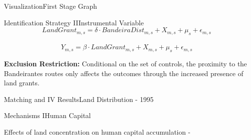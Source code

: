 \documentclass[aspectratio=1610]{beamer}
\begin{document}
\begin{frame}{Visualization}{First Stage Graph}
    \begin{figure}[h!]
        \begin{center}
        \end{center}
      \end{figure}
\end{frame}

\begin{frame}{Identification Strategy II}{Instrumental Variable}
    \begin{equation}
        \label{eqn:firststage}
        LandGrant_{m,s} = \delta \cdot BandeiraDist_{m,s} +  X_{m,s} + \mu_s  + \epsilon_{m,s}
      \end{equation}

      \begin{equation}
        \label{eqn:ivequation}
        Y_{m,s} = \beta \cdot \widehat{LandGrant}_{m,s} + X_{m,s} + \mu_s +  \epsilon_{m,s}
      \end{equation}

    \vspace{2mm}
      
    \begin{outline}
        \1 \textbf{Exclusion Restriction:} Conditional on the set of controls, the proximity to the Bandeirantes routes only affects the outcomes through the increased presence of land grants.
    \end{outline}
\end{frame}

\begin{frame}{Matching and IV Results}{Land Distribution - 1995}
    \footnotesize
    
\end{frame}

\begin{frame}{Mechanisms I}{Human Capital}
    \begin{outline}
        \1 Effects of land concentration on human capital accumulation - \parencite{Galor2009-bc}  
           
    \end{outline}
\end{frame}
\end{document}
